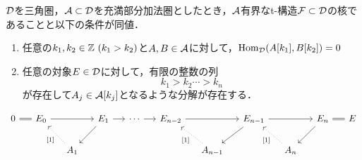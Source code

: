 \begin{lemm}
	${\mathcal D}$を三角圏，${\mathcal A}\subset{\mathcal D}$を充満部分加法圏としたとき，${\mathcal A}$有界なt-構造${\mathcal F}\subset{\mathcal D}$の核であることと以下の条件が同値．\vspace{-3mm}
	\begin{enumerate}[label=\roman*.]
		\item
			任意の$k_1,k_2\in\ZZ\ (k_1>k_2)$と$A,B\in{\mathcal A}$に対して，$\operatorname{\mathrm{Hom}}_{{\mathcal D}}(A[k_1],B[k_2])=0$
		\item
			任意の対象$E\in{\mathcal D}$に対して，有限の整数の列
			\[k_1>k_2 \cdots > k_n\]
			が存在して$A_j\in {\mathcal A}[k_j]$となるような分解が存在する．
	\end{enumerate}
\end{lemm}
\begin{pf}
	\[
		\begin{tikzcd}[column sep=1.3em]
			0\ar[r,equal]&E_0\ar[rr]& & E_{1}\ar[r]\ar[ld] &\cdots\ar[r] &E_{n-2}\ar[rr]&&E_{n-1}\ar[ld]\ar[rr]&&E_n\ar[ld]\ar[r,equal]&E\\
									 &&A_{1}\ar[lu,dotted,"{[1]}"] &&&&A_{n-1}\ar[lu,dotted,"{[1]}"]&&A_n\ar[lu,dotted,"{[1]}"]
		\end{tikzcd}
	\]
				
	\end{pf}
